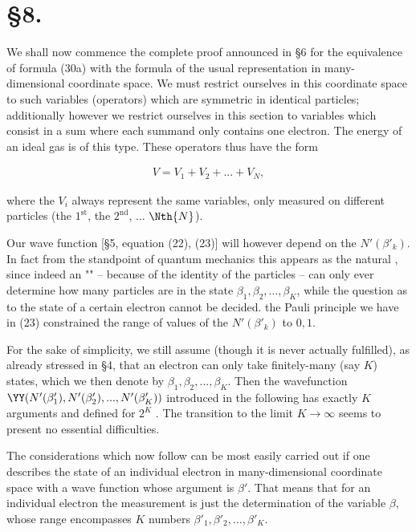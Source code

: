 \documentclass{article}
\newcommand{\nequ}[2]{
\begin{align*}
#1
\tag{#2}
\end{align*}
}
\begin{document}
\section*{§8.}
We shall now commence the complete proof announced in §6 for the equivalence of formula (30a) with the formula of the usual representation in many-dimensional coordinate space. We must restrict ourselves in this coordinate space to such variables (operators) which are symmetric in identical particles; additionally however we restrict ourselves in this section to variables which consist in a sum where each summand only contains one electron. The energy of an ideal gas is of this type. These operators thus have the form
\nequ{
V=V_1+V_2+...+V_N,
}{60}
where the $V_i$ always represent
the same variables, only measured on different particles (the $1^{\text{st}}$, the $2^{\text{nd}}$, ... $\Nth{N}$).

Our wave function [§5, equation (22), (23)] will however depend on the $N'(\beta'_k)$. In fact from the standpoint of quantum mechanics this appears as the natural , since indeed an "" -- because of the identity of the particles -- can only ever determine how many particles are in the state $\beta_1,\beta_2,...,\beta_K$, while the question as to the state of a certain electron cannot be decided.  the Pauli principle we have in (23) constrained the range of values of the $N'(\beta'_k)$ to $0,1$.

For the sake of simplicity, we still assume (though it is never actually fulfilled), as already stressed in §4, that an electron can only take finitely-many (say $K$) states, which we then denote by $\beta_1,\beta_2,...,\beta_K$. Then the wavefunction $\YY(N'(\beta'_1), N'(\beta'_2),..., N'(\beta'_K))$ introduced in the following has exactly $K$ arguments and defined for $2^K$ . The transition to the limit $K\to\infty$ seems to present no essential difficulties.

The considerations which now follow can be most easily carried out if one describes the state of an individual electron in many-dimensional coordinate space with a wave function whose argument is $\beta'$. That means that for an individual electron the measurement is just the determination of the variable $\beta$, whose range encompasses $K$ numbers $\beta'_1, \beta'_2,...,\beta'_K$.
\end{document}
